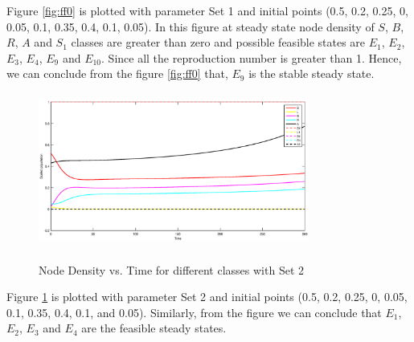 \documentclass[conference]{IEEEtran}
\begin{document}
\indent Figure \ref{fig:ff0} is plotted with parameter Set 1 and initial points (0.5, 0.2, 0.25, 0, 0.05, 0.1, 0.35, 0.4, 0.1, 0.05). In this figure at steady state node density of $S$, $B$, $R$, $A$ and $S_{1}$ classes are greater than zero and possible feasible states are $E_{1}$, $E_{2}$, $E_{3}$, $E_{4}$, $E_{9}$ and $E_{10}$. Since all the reproduction number is greater than 1. Hence, we can conclude from the figure \ref{fig:ff0} that, $E_{9}$ is the stable steady state.\\
\begin{figure}
\centering
  \includegraphics[width=3.5in,height=2.0in]{2.eps}\\
  \caption{Node Density vs. Time for different classes with Set 2}\label{fig:ff2}
\end{figure}
\indent Figure \ref{fig:ff2} is plotted with parameter Set 2 and initial points (0.5, 0.2, 0.25, 0, 0.05, 0.1, 0.35, 0.4, 0.1, and 0.05). Similarly, from the figure we can conclude that $E_{1}$, $E_{2}$, $E_{3}$ and  $E_{4}$ are the feasible steady states.
\end{document}
